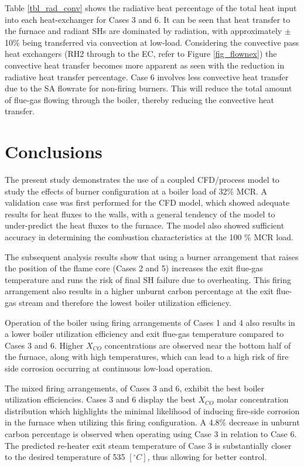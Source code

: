 \documentclass[11pt,cleanfoot]{asme2ej}
\begin{document}
Table \ref{tbl_rad_conv} shows the radiative heat percentage of the total heat input into each heat-exchanger for Cases 3 and 6. It can be seen that heat transfer to the furnace and radiant SHs are dominated by radiation, with approximately $\pm$ 10\% being transferred via convection at low-load. Considering the convective pass heat exchangers (RH2 through to the EC, refer to Figure \ref{fig_flownex}) the convective heat transfer becomes more apparent as seen with the reduction in radiative heat transfer percentage. Case 6 involves less convective heat transfer due to the SA flowrate for non-firing burners. This will reduce the total amount of flue-gas flowing through the boiler, thereby reducing the convective heat transfer.
\section{Conclusions}
The present study demonstrates the use of a coupled CFD/process model to study the effects of burner configuration at a boiler load of 32\% MCR. A validation case was first performed for the CFD model, which showed adequate results for heat fluxes to the walls, with a general tendency of the model to under-predict the heat fluxes to the furnace. The model also showed sufficient accuracy in determining the combustion characteristics at the 100 \% MCR load.

The subsequent analysis results show that using a burner arrangement that raises the position of the flame core (Cases 2 and 5) increases the exit flue-gas temperature and runs the risk of final SH failure due to overheating. This firing arrangement also results in a higher unburnt carbon percentage at the exit flue-gas stream and therefore the lowest boiler utilization efficiency. 

Operation of the boiler using firing arrangements of Cases 1 and 4 also results in a lower boiler utilization efficiency and exit flue-gas temperature compared to Cases 3 and 6. Higher $X_{CO}$ concentrations are observed near the bottom half of the furnace, along with high temperatures, which can lead to a high risk of fire side corrosion occurring at continuous low-load operation. 

The mixed firing arrangements, of Cases 3 and 6, exhibit the best boiler utilization efficiencies. Cases 3 and 6 display the best $X_{CO}$ molar concentration distribution which highlights the minimal likelihood of inducing fire-side corrosion in the furnace when utilizing this firing configuration. A 4.8\% decrease in unburnt carbon percentage is observed when operating using Case 3 in relation to Case 6. The predicted re-heater exit steam temperature of Case 3 is substantially closer to the desired temperature of 535 $[^\circ C]$, thus allowing for better control.
\end{document}
